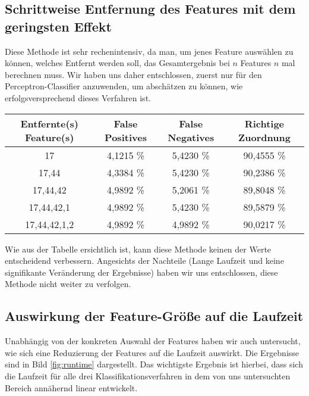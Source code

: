 \subsection{Schrittweise Entfernung des Features mit dem geringsten Effekt}

Diese Methode ist sehr rechenintensiv, da man, um jenes Feature auswählen zu können, welches Entfernt werden soll, das Gesamtergebnis bei $n$ Features $n$ mal berechnen muss. Wir haben uns daher entschlossen, zuerst nur für den Perceptron-Classifier anzuwenden, um abschätzen zu können, wie erfolgsversprechend dieses Verfahren ist.

\begin{center}
	\begin{tabular}{ | c | c | c | c | }
		\hline
		Entfernte(s) Feature(s) & False Positives & False Negatives & Richtige Zuordnung \\ \hline
		17 & 4,1215 \% & 5,4230 \% & 90,4555 \% \\ \hline
		17,44 & 4,3384 \% & 5,4230 \% & 90,2386 \% \\ \hline
		17,44,42 & 4,9892 \% & 5,2061 \% & 89,8048 \% \\ \hline
		17,44,42,1 & 4,9892 \% & 5,4230 \% & 89,5879 \% \\ \hline
		17,44,42,1,2 & 4,9892 \% & 4,9892 \% & 90,0217 \% \\ \hline
	\end{tabular}
\end{center}

Wie aus der Tabelle ersichtlich ist, kann diese Methode keinen der Werte entscheidend verbessern. Angesichts der Nachteile (Lange Laufzeit und keine signifikante Veränderung der Ergebnisse) haben wir uns entschlossen, diese Methode nicht weiter zu verfolgen.

\subsection{Auswirkung der Feature-Größe auf die Laufzeit}
\label{subsect:feat_runtime_fx}
Unabhängig von der konkreten Auswahl der Features haben wir auch untersucht, wie sich eine Reduzierung der Features auf die Laufzeit auswirkt. Die Ergebnisse sind in Bild \ref{fig:runtime} dargestellt. Das wichtigste Ergebnis ist hierbei, dass sich die Laufzeit für alle drei Klassifikationsverfahren in dem von uns untersuchten Bereich annähernd linear entwickelt.

